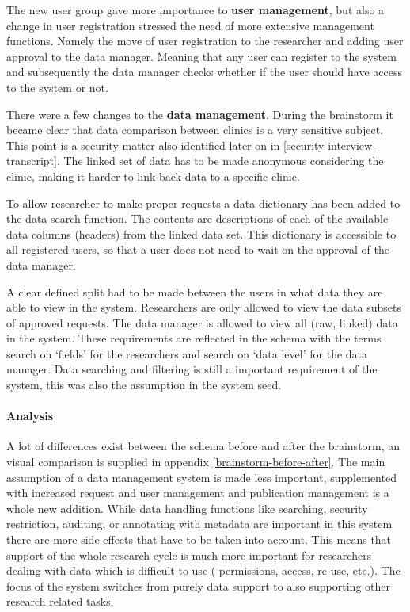 The new user group gave more importance to \textbf{user management}, but also a change in user registration stressed the need of more extensive management functions.
Namely the move of user registration to the researcher and adding user approval to the data manager.
Meaning that any user can register to the system and subsequently the data manager checks whether if the user should have access to the system or not.

There were a few changes to the \textbf{data management}.
During the brainstorm it became clear that data comparison between clinics is a very sensitive subject.
This point is a security matter also identified later on in \ref{security-interview-transcript}.
The linked set of data has to be made anonymous considering the clinic, making it harder to link back data to a specific clinic.

To allow researcher to make proper requests a data dictionary has been added to the data search function.
The contents are descriptions of each of the available data columns (headers) from the linked data set.
This dictionary is accessible to all registered users, so that a user does not need to wait on the approval of the data manager.

A clear defined split had to be made between the users in what data they are able to view in the system.
Researchers are only allowed to view the data subsets of approved requests.
The data manager is allowed to view all (raw, linked) data in the system.
These requirements are reflected in the schema with the terms search on `fields' for the researchers and search on `data level' for the data manager.
Data searching and filtering is still a important requirement of the system, this was also the assumption in the system seed.

\paragraph{Analysis}
A lot of differences exist between the schema before and after the brainstorm, an visual comparison is supplied in appendix \ref{brainstorm-before-after}.
The main assumption of a data management system is made less important, supplemented with increased request and user management and publication management is a whole new addition.
While data handling functions like searching, security restriction, auditing, or annotating with metadata are important in this system there are more side effects that have to be taken into account.
This means that support of the whole research cycle is much more important for researchers dealing with data which is difficult to use (\ie{} permissions, access, re-use, etc.).
The focus of the system switches from purely data support to also supporting other research related tasks.

